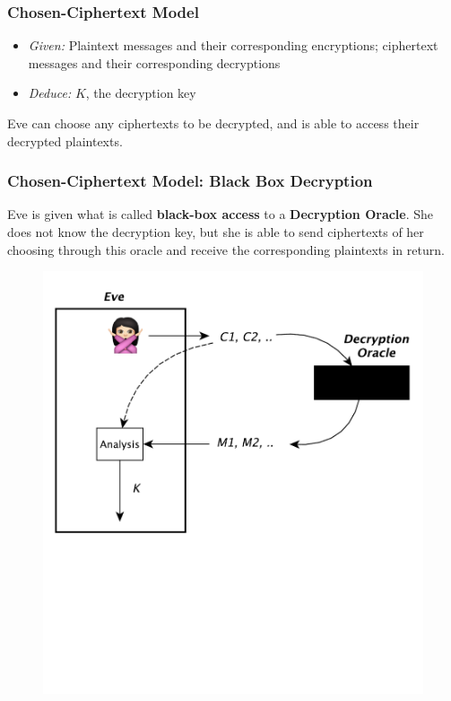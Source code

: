 \documentclass{beamer}
\newcommand{\<}{\langle}
\renewcommand{\>}{\rangle}
\begin{document}
\begin{frame}
\frametitle{Chosen-Ciphertext Model}

\begin{itemize}
\item \emph{Given:} Plaintext messages and their corresponding encryptions; ciphertext messages and their corresponding decryptions 
\item \emph{Deduce:} $K$, the decryption key
\end{itemize}

Eve can choose any ciphertexts to be decrypted, and is able to access their decrypted plaintexts. 
\end{frame}


\begin{frame}
\frametitle{Chosen-Ciphertext Model: Black Box Decryption}

Eve is given what is called \textbf{black-box access} to a \textbf{Decryption Oracle}. She does not know the decryption key, but she is able to send ciphertexts of her choosing through this oracle and receive the corresponding plaintexts in return. 
\begin{figure}
\centering
\includegraphics[scale=.5]{IMG/attack4.pdf}
\end{figure}
\end{frame}
\end{document}
